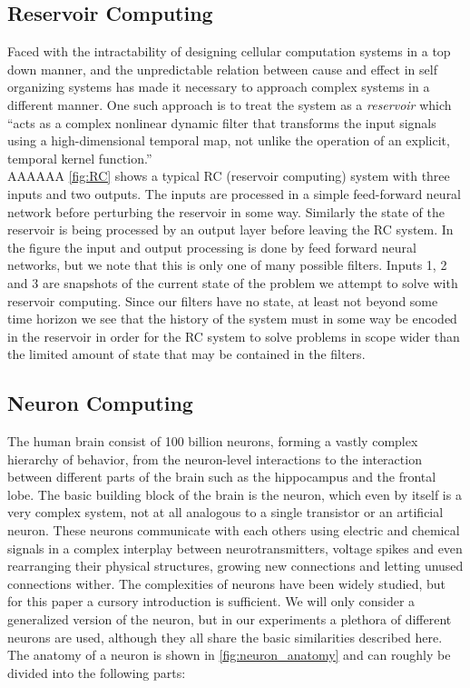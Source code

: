 \subsection{Reservoir Computing}
Faced with the intractability of designing cellular computation systems in a top
down manner, and the unpredictable relation between cause and effect in self organizing
systems has made it necessary to approach complex systems in a different manner.
One such approach is to treat the system as a \textit{reservoir}
\cite{schrauwen_overview_2007} which
``acts as a complex nonlinear dynamic filter that transforms the
input signals using a high-dimensional temporal map, not unlike the operation
of an explicit, temporal kernel function.''\\
AAAAAA
\ref{fig:RC} shows a typical RC (reservoir computing) system with three inputs
and two outputs. The inputs are processed in a simple feed-forward neural
network before perturbing the reservoir in some way.
Similarly the state of the reservoir is being processed by an output layer
before leaving the RC system.
In the figure the input and output processing is done by feed forward neural
networks, but we note that this is only one of many possible filters.
Inputs 1, 2 and 3 are snapshots of the current state of the problem we attempt
to solve with reservoir computing.
Since our filters have no state, at least not beyond some time horizon we see
that the history of the system must in some way be encoded in the reservoir in
order for the RC system to solve problems in scope wider than the limited amount
of state that may be contained in the filters.
\begin{figure*}[h]
  
  \caption{A reservoir comput-thingy}
  \label{fig:RC}
\end{figure*}
\subsection{Neuron Computing}
The human brain consist of 100 billion neurons, forming a vastly complex
hierarchy of behavior, from the neuron-level interactions to the interaction
between different parts of the brain such as the hippocampus and the frontal lobe.
The basic building block of the brain is the neuron, which even by itself is a
very complex system, not at all analogous to a single transistor or an artificial
neuron.
These neurons communicate with each others using electric and chemical signals
in a complex interplay between neurotransmitters, voltage spikes and even
rearranging their physical structures, growing new connections and letting
unused connections wither.
The complexities of neurons have been widely studied, but for this paper a
cursory introduction is sufficient.
We will only consider a generalized version of the neuron, but in our
experiments a plethora of different neurons are used, although they
all share the basic similarities described here.
The anatomy of a neuron is shown in \ref{fig:neuron_anatomy} and can roughly be
divided into the following parts:
